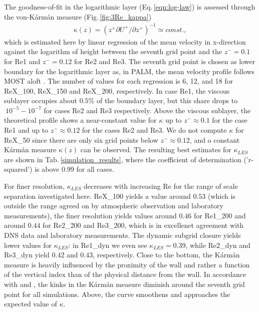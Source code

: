\documentclass[a4paper,11pt]{article}
\begin{document}
The goodness-of-fit in the loga\-rith\-mic layer (Eq.\,\ref{eqn:log-law}) is assessed through the von-K\'ar\-m\'an mea\-sure (Fig.\,\ref{fig:3Re_kappa})
\begin{align}
  \kappa(z)=(z^+\partial U^+/\partial z^+)^{-1}\simeq const.,
\end{align}
which is estimated here by linear regression of the mean velocity in x-direction against the logarithm of height between the seventh grid point and the $z^-=0.1$ for Re1 and $z^-=0.12$ for Re2 and Re3. The seventh grid point is chosen as lower boundary for the logarithmic layer as, in PALM, the mean velocity profile follows MOST aloft \citep{maronga2020improved}. The number of values for each regression is 6, 12, and 18 for ReX\_100, ReX\_150 and ReX\_200, respectively.  In case Re1, the viscous sublayer occupies about $0.5\%$ of the boundary layer, but this share drops to $~10^{-5}-10^{-7}$ for cases Re2 and Re3 respectively. Above the viscous sublayer, the theoretical profile shows a near-constant value for $\kappa$ up to $z^-\approx0.1$ for the case Re1 and up to $z^-\approx0.12$ for the cases Re2 and Re3. We do not compute $\kappa$ for ReX\_50 since there are only six grid points below $z^-\approx 0.12$, and o constant K\'arm\'an measure $\kappa(z)$ can be observed. The resulting best estimates for $\kappa_{LES}$ are shown in Tab.\,\ref{simulation_results}, where the coefficient of determination ('r-squared') is above 0.99 for all cases. 

For finer resolution, $\kappa_{LES}$ decreases with increasing Re for the range of scale separation investigated here. ReX\_100 yields a value around $0.53$ (which is outside the range agreed on by atmospheric observation and laboratory measurements), the finer resolution yields values around $0.46$ for Re1\_200 and around $0.44$ for Re2\_200 and Re3\_200, which is in excellenet agreement with DNS data and laboratory measurements. The dynamic subgrid closure yields lower values for $\kappa_{LES}$: in Re1\_dyn we even see $\kappa_{LES}=0.39$, while Re2\_dyn and Re3\_dyn yield $0.42$ and $0.43$, respectively. Close to the bottom, the K\'arm\'an measure is heavily influenced by the proximity of the wall and rather a function of the vertical index than of the physical distance from the wall. In accordance with \cite{maronga2014monin} and \cite{maronga2017formulation}, the kinks in the K\'arm\'an measure diminish around the seventh grid point for all simulations. Above, the curve smoothens and approaches the expected value of $\kappa$.  
\end{document}
